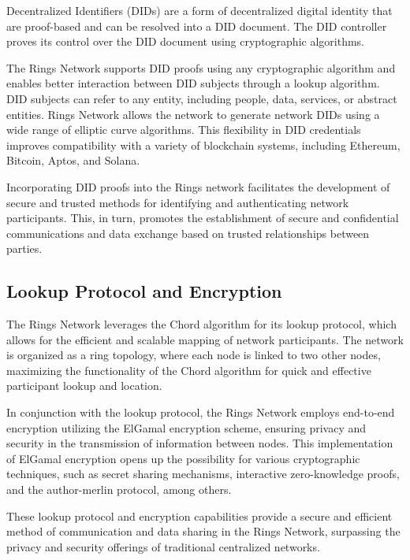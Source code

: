 \documentclass[twocolumn]{article}
\begin{document}
Decentralized Identifiers (DIDs) are a form of decentralized digital identity that are proof-based and can be resolved into a DID document. The DID controller proves its control over the DID document using cryptographic algorithms.

  The Rings Network supports DID proofs using any cryptographic algorithm and enables better interaction between DID subjects through a lookup algorithm. DID subjects can refer to any entity, including people, data, services, or abstract entities. Rings Network allows the network to generate network DIDs using a wide range of elliptic curve algorithms. This flexibility in DID credentials improves compatibility with a variety of blockchain systems, including Ethereum\cite{Ethereum}, Bitcoin\cite{Bitcoin}, Aptos, and Solana\cite{Solana}.

Incorporating DID proofs into the Rings network facilitates the development of secure and trusted methods for identifying and authenticating network participants. This, in turn, promotes the establishment of secure and confidential communications and data exchange based on trusted relationships between parties.


\subsection{Lookup Protocol and Encryption}

The Rings Network leverages the Chord algorithm\cite{Chord} for its lookup protocol, which allows for the efficient and scalable mapping of network participants. The network is organized as a ring topology, where each node is linked to two other nodes, maximizing the functionality of the Chord algorithm for quick and effective participant lookup and location.

In conjunction with the lookup protocol, the Rings Network employs end-to-end encryption utilizing the ElGamal encryption scheme, ensuring privacy and security in the transmission of information between nodes. This implementation of ElGamal encryption\cite{ElGamalEncryption} opens up the possibility for various cryptographic techniques, such as secret sharing\cite{ssss} mechanisms, interactive zero-knowledge proofs\cite{zkp}, and the author-merlin protocol\cite{amp}, among others.

These lookup protocol and encryption capabilities provide a secure and efficient method of communication and data sharing in the Rings Network, surpassing the privacy and security offerings of traditional centralized networks.
\end{document}
